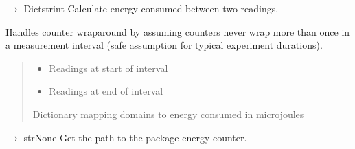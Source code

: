 \documentclass[letterpaper,10pt,english]{sphinxmanual}
\begin{document}
\begin{fulllineitems}
\begin{fulllineitems}
\label{\detokenize{core.readers.rapl_reader:core.readers.rapl_reader.RAPLReader.get_energy_delta}}
\pysigstartsignatures
\pysiglinewithargsret
{}
{\sphinxparamcomma {}}
{{ $\rightarrow$ Dict\DUrole{p}{{[}}strint\DUrole{p}{{]}}}}
\pysigstopsignatures
\sphinxAtStartPar
Calculate energy consumed between two readings.

\sphinxAtStartPar
Handles counter wrap\sphinxhyphen{}around by assuming counters never wrap more than once
in a measurement interval (safe assumption for typical experiment durations).
\begin{quote}\begin{description}
\begin{itemize}
\item {} 
\sphinxAtStartPar
{} \textendash{} Readings at start of interval

\item {} 
\sphinxAtStartPar
{} \textendash{} Readings at end of interval

\end{itemize}

\sphinxAtStartPar
Dictionary mapping domains to energy consumed in microjoules

\end{description}\end{quote}

\end{fulllineitems}


\begin{fulllineitems}
\label{\detokenize{core.readers.rapl_reader:core.readers.rapl_reader.RAPLReader.get_package_path}}
\pysigstartsignatures
\pysiglinewithargsret
{}
{}
{{ $\rightarrow$ strNone}}
\pysigstopsignatures
\sphinxAtStartPar
Get the path to the package energy counter.


\end{fulllineitems}
\end{fulllineitems}
\end{document}
